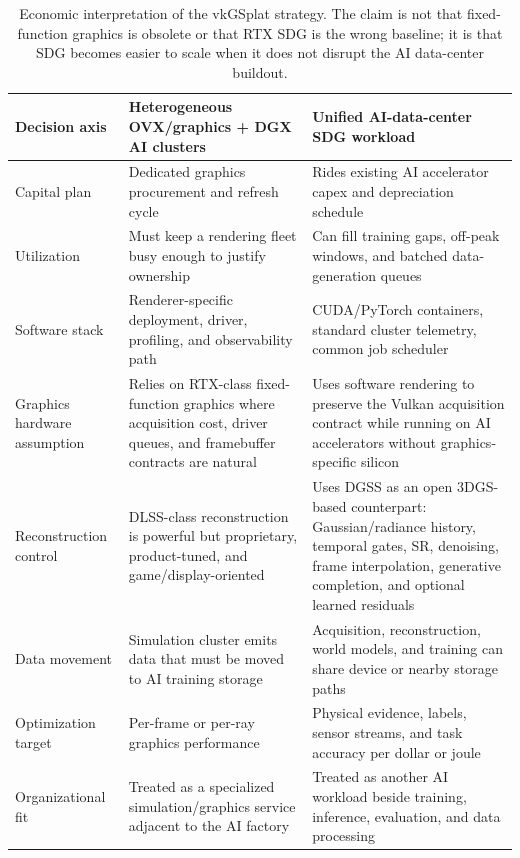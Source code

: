 \documentclass[10pt,journal,onecolumn]{IEEEtran}
\begin{document}
\begin{table}[t]
\centering
\small
\caption{Economic interpretation of the vkGSplat strategy. The claim is not
that fixed-function graphics is obsolete or that RTX SDG is the wrong baseline;
it is that SDG becomes easier to scale when it does not disrupt the AI
data-center buildout.}
\label{tab:economic-case}
\begin{tabular}{p{}p{}p{}}
\toprule
\textbf{Decision axis} & \textbf{Heterogeneous OVX/graphics + DGX AI clusters} & \textbf{Unified AI-data-center SDG workload} \\
\midrule
Capital plan & Dedicated graphics procurement and refresh cycle & Rides existing AI accelerator capex and depreciation schedule \\
Utilization & Must keep a rendering fleet busy enough to justify ownership & Can fill training gaps, off-peak windows, and batched data-generation queues \\
Software stack & Renderer-specific deployment, driver, profiling, and observability path & CUDA/PyTorch containers, standard cluster telemetry, common job scheduler \\
Graphics hardware assumption & Relies on RTX-class fixed-function graphics where acquisition cost, driver queues, and framebuffer contracts are natural & Uses software rendering to preserve the Vulkan acquisition contract while running on AI accelerators without graphics-specific silicon \\
Reconstruction control & DLSS-class reconstruction is powerful but proprietary, product-tuned, and game/display-oriented & Uses DGSS as an open 3DGS-based counterpart: Gaussian/radiance history, temporal gates, SR, denoising, frame interpolation, generative completion, and optional learned residuals \\
Data movement & Simulation cluster emits data that must be moved to AI training storage & Acquisition, reconstruction, world models, and training can share device or nearby storage paths \\
Optimization target & Per-frame or per-ray graphics performance & Physical evidence, labels, sensor streams, and task accuracy per dollar or joule \\
Organizational fit & Treated as a specialized simulation/graphics service adjacent to the AI factory & Treated as another AI workload beside training, inference, evaluation, and data processing \\
\bottomrule
\end{tabular}
\end{table}
\end{document}
